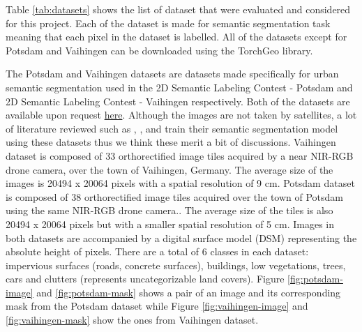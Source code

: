 \FloatBarrier

Table \ref{tab:datasets} shows the list of dataset that were evaluated and considered for this project. Each of the dataset is made for semantic segmentation task meaning that each pixel in the dataset is labelled. All of the datasets except for Potsdam and Vaihingen can be downloaded using the TorchGeo library. 

The Potsdam and Vaihingen datasets \cite{potsdam-vaihingen} are datasets made specifically for urban semantic segmentation used in the 2D Semantic Labeling Contest - Potsdam and 2D Semantic Labeling Contest - Vaihingen respectively. Both of the datasets are available upon request \href{https://www.isprs.org/education/benchmarks/UrbanSemLab/detection-and-reconstruction.aspx#VaihigenDataDescr}{here}. Although the images are not taken by satellites, a lot of literature reviewed such as \cite{unetformer}, \cite{a-novel-transformer}, \cite{multi-attention-network} and \cite{A2-FPN} train their semantic segmentation model using these datasets thus we think these merit a bit of discussions. Vaihingen dataset is composed of 33 orthorectified image tiles acquired by a near NIR-RGB drone camera, over the town of Vaihingen, Germany. The average size of the images is 20494 x 20064 pixels with a spatial resolution of 9 cm. Potsdam dataset is composed of 38 orthorectified image tiles acquired  over the town of Potsdam using the same NIR-RGB drone camera.. The average size of the tiles is also 20494 x 20064 pixels but with a smaller spatial resolution of 5 cm. Images in both datasets are accompanied by a digital surface model (DSM) representing the absolute height of pixels. There are a total of 6 classes in each dataset: impervious surfaces (roads, concrete surfaces), buildings, low vegetations, trees, cars and clutters (represents uncategorizable land covers).  Figure \ref{fig:potsdam-image} and \ref{fig:potsdam-mask} shows a pair of an image and its corresponding mask from the Potsdam dataset while Figure \ref{fig:vaihingen-image} and \ref{fig:vaihingen-mask} show the ones from Vaihingen dataset.


